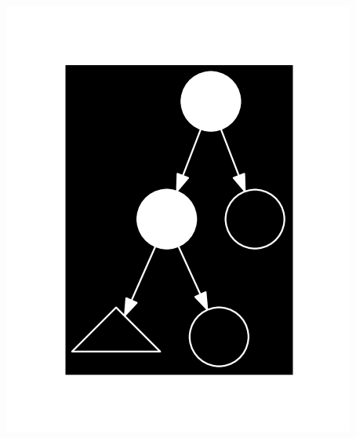 \begin{frame}
\begin{columns}
\begin{center}
\includegraphics[scale=0.5]{figures/shape}
\end{center}

\end{columns}

\end{frame}
